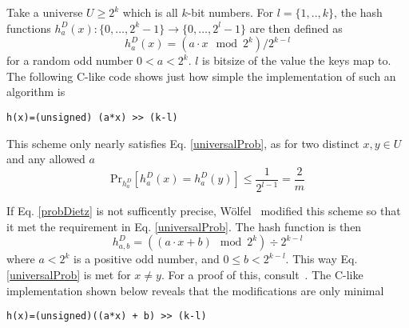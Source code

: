 \documentclass[../../main.tex]{subfiles}
\begin{document}
\noindent Take a universe $U\geq 2^k$ which is all $k$-bit numbers. For $l=\{1,..,k\}$, the hash functions $h_a^D(x):\{0,\ldots,2^k-1\}\rightarrow\{0,\ldots,2^l-1\}$ are then defined as
\begin{equation}\label{dietzhash}
h_a^D(x)=(a\cdot x \mod 2^k) / 2^{k-l}
\end{equation}
\noindent for a random odd number $0<a<2^k$. $l$ is bitsize of the value the keys map to. The following C-like code shows just how simple the implementation of such an algorithm is
\begin{lstlisting}
h(x)=(unsigned) (a*x) >> (k-l)
\end{lstlisting} 

This scheme only nearly satisfies Eq. \ref{universalProb}, as for two distinct $x,y\in U$ and any allowed $a$
\begin{equation}\label{probDietz}
\mathrm{Pr}_{h_a^D}[h_a^D(x)=h_a^D(y)]\leq \frac{1}{2^{l-1}}=\frac{2}{m}
\end{equation}

If Eq. \ref{probDietz} is not sufficently precise, Wölfel~\cite[p.18-19]{multiplyshiftTruly} modified this scheme so that it met the requirement in Eq. \ref{universalProb}. The hash function is then
$$
h_{a,b}^{D}=((a\cdot x + b) \mod 2^k)\div 2^{k-l} 
$$
where $a<2^k$ is a positive odd number, and $0\leq b<2^{k-l}$. This way Eq. \ref{universalProb} is met for $x\neq y$. For a proof of this, consult~\cite{multiplyshiftTruly}. The C-like implementation shown below reveals that the modifications are only minimal

\begin{lstlisting}
h(x)=(unsigned)((a*x) + b) >> (k-l)
\end{lstlisting}
\end{document}
